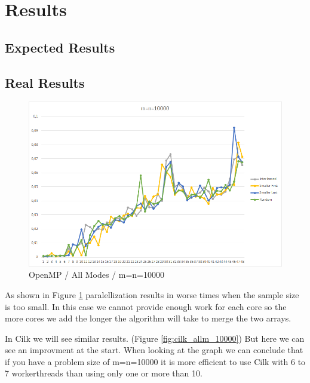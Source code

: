 \documentclass[12pt,a4paper,titlepage,oneside]{scrartcl}
\begin{document}
\section{Results}


\subsection{Expected Results}



\subsection{Real Results}

\begin{figure}[h]
\includegraphics[width=\linewidth]{Saturn_OpenMP_10000}
\caption{OpenMP / All Modes / m=n=10000}
\label{fig:omp_allm_10000}
\end{figure}

As shown in Figure \ref{fig:omp_allm_10000} paralellization results in worse times when the sample size is too small. In this case we cannot provide enough work for each core so the more cores we add the longer the algorithm will take to merge the two arrays.

In Cilk we will see similar results. (Figure \ref{fig:cilk_allm_10000}) But here we can see an improvment at the start. When looking at the graph we can conclude that if you have a problem size of m=n=10000 it is more efficient to use Cilk with 6 to 7 workerthreads than using only one or more than 10.
\end{document}
